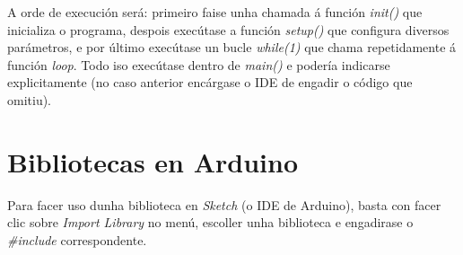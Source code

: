    A orde de execución será: primeiro faise unha chamada á función
   \textit{init()} que inicializa o programa, despois execútase a función
   \textit{setup()} que configura diversos parámetros, e por último execútase
   un bucle \textit{while(1)} que chama repetidamente á función \textit{loop}.
   Todo iso execútase dentro de \textit{main()} e podería indicarse
   explicitamente (no caso anterior encárgase o IDE de engadir o código que
   omitiu).

\section{Bibliotecas en Arduino}

Para facer uso dunha biblioteca en \textit{Sketch} (o IDE de Arduino), basta
con facer clic sobre \textit{Import Library} no menú, escoller unha biblioteca
e engadirase o \textit{\#include} correspondente.

